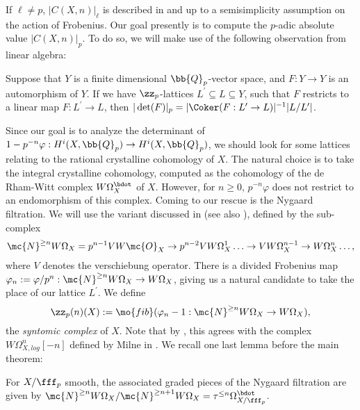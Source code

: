 If $\ell\neq p$, $|C(X,n)|_{\ell}$ is described in \cite{Schneider1982} and \cite{Neukirch1978/79} up to a semisimplicity assumption on the action of Frobenius.  Our goal presently is to compute the $p$-adic absolute value $|C(X,n)|_{p}$.  To do so, we will make use of the following observation from linear algebra: 
\begin{lemma}\label{lem21}
Suppose that $Y$ is a finite dimensional $\bb{Q}_p$-vector space, and $F:Y\to Y$ is an automorphism of $Y$.  If we have $\zz_p$-lattices $L^{\prime}\subseteq L\subseteq Y$, such that $F$ restricts to a linear map $F:L^{\prime}\to L$, then $|\det(F)|_p=|\Coker(F:L^{\prime}\to L)|^{-1}|L/L^{\prime}|$.
\end{lemma}
Since our goal is to analyze the determinant of $1-p^{-n}\varphi:H^i(X,\bb{Q}_p)\to H^i(X,\bb{Q}_p)$, we should look for some lattices relating to the rational crystalline cohomology of $X$.  The natural choice is to take the integral crystalline cohomology, computed as the cohomology of the de Rham-Witt complex $W\Omega_X^{\bdot}$ of $X$.  However, for $n\geq 0$, $p^{-n}\varphi$ does not restrict to an endomorphism of this complex.  Coming to our rescue is the Nygaard filtration.  We will use the variant discussed in \cite[~]{bhatt2019topological} (see also \cite{Illusie1979ComplexeDD}), defined by the sub-complex $$\mc{N}^{\geq n}W\Omega_{X} = p^{n-1}VW\mc{O}_X\to p^{n-2}VW\Omega^1_{X}\ldots \to VW\Omega_{X}^{n-1}\to W\Omega_X^{n}\ldots,$$ where $V$ denotes the verschiebung operator.  There is a divided Frobenius map $\varphi_n:=\varphi/p^n:\mc{N}^{\geq n}W\Omega_X\to W\Omega_X$, giving us a natural candidate to take the place of our lattice $L^{\prime}$.  We define \begin{equation} \label{eq21}
	\zz_p(n)(X):=\mo{fib}(\varphi_n-1:\mc{N}^{\geq n}W\Omega_X\to W\Omega_{X}), \end{equation} the \textit{syntomic complex} of $X$.  Note that by \cite{bhatt2019topological}, this agrees with the complex $W\Omega_{X,log}^n[-n]$ defined by Milne in \cite{MilneValues}.  We recall one last lemma before the main theorem:
\begin{lemma}\label{lem22}
For $X/\fff_p$ smooth, the associated graded pieces of the Nygaard filtration are given by $\mc{N}^{\geq n}W\Omega_X/\mc{N}^{\geq n+1}W\Omega_X=\tau^{\leq n}\Omega_{X/\fff_p}^{\bdot}$.
\end{lemma}

